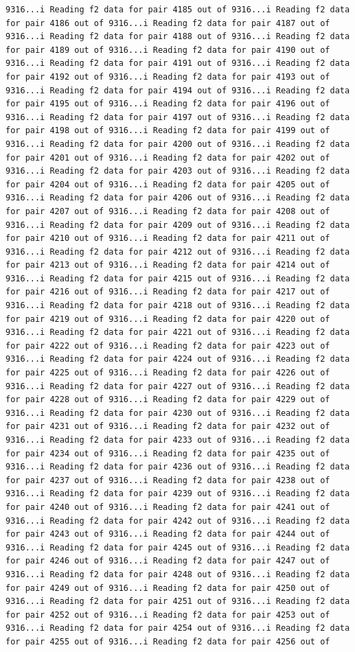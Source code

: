 \documentclass[
]{article}
\begin{document}
\begin{verbatim}
9316...i Reading f2 data for pair 4185 out of 9316...i Reading f2 data for pair 4186 out of 9316...i Reading f2 data for pair 4187 out of 9316...i Reading f2 data for pair 4188 out of 9316...i Reading f2 data for pair 4189 out of 9316...i Reading f2 data for pair 4190 out of 9316...i Reading f2 data for pair 4191 out of 9316...i Reading f2 data for pair 4192 out of 9316...i Reading f2 data for pair 4193 out of 9316...i Reading f2 data for pair 4194 out of 9316...i Reading f2 data for pair 4195 out of 9316...i Reading f2 data for pair 4196 out of 9316...i Reading f2 data for pair 4197 out of 9316...i Reading f2 data for pair 4198 out of 9316...i Reading f2 data for pair 4199 out of 9316...i Reading f2 data for pair 4200 out of 9316...i Reading f2 data for pair 4201 out of 9316...i Reading f2 data for pair 4202 out of 9316...i Reading f2 data for pair 4203 out of 9316...i Reading f2 data for pair 4204 out of 9316...i Reading f2 data for pair 4205 out of 9316...i Reading f2 data for pair 4206 out of 9316...i Reading f2 data for pair 4207 out of 9316...i Reading f2 data for pair 4208 out of 9316...i Reading f2 data for pair 4209 out of 9316...i Reading f2 data for pair 4210 out of 9316...i Reading f2 data for pair 4211 out of 9316...i Reading f2 data for pair 4212 out of 9316...i Reading f2 data for pair 4213 out of 9316...i Reading f2 data for pair 4214 out of 9316...i Reading f2 data for pair 4215 out of 9316...i Reading f2 data for pair 4216 out of 9316...i Reading f2 data for pair 4217 out of 9316...i Reading f2 data for pair 4218 out of 9316...i Reading f2 data for pair 4219 out of 9316...i Reading f2 data for pair 4220 out of 9316...i Reading f2 data for pair 4221 out of 9316...i Reading f2 data for pair 4222 out of 9316...i Reading f2 data for pair 4223 out of 9316...i Reading f2 data for pair 4224 out of 9316...i Reading f2 data for pair 4225 out of 9316...i Reading f2 data for pair 4226 out of 9316...i Reading f2 data for pair 4227 out of 9316...i Reading f2 data for pair 4228 out of 9316...i Reading f2 data for pair 4229 out of 9316...i Reading f2 data for pair 4230 out of 9316...i Reading f2 data for pair 4231 out of 9316...i Reading f2 data for pair 4232 out of 9316...i Reading f2 data for pair 4233 out of 9316...i Reading f2 data for pair 4234 out of 9316...i Reading f2 data for pair 4235 out of 9316...i Reading f2 data for pair 4236 out of 9316...i Reading f2 data for pair 4237 out of 9316...i Reading f2 data for pair 4238 out of 9316...i Reading f2 data for pair 4239 out of 9316...i Reading f2 data for pair 4240 out of 9316...i Reading f2 data for pair 4241 out of 9316...i Reading f2 data for pair 4242 out of 9316...i Reading f2 data for pair 4243 out of 9316...i Reading f2 data for pair 4244 out of 9316...i Reading f2 data for pair 4245 out of 9316...i Reading f2 data for pair 4246 out of 9316...i Reading f2 data for pair 4247 out of 9316...i Reading f2 data for pair 4248 out of 9316...i Reading f2 data for pair 4249 out of 9316...i Reading f2 data for pair 4250 out of 9316...i Reading f2 data for pair 4251 out of 9316...i Reading f2 data for pair 4252 out of 9316...i Reading f2 data for pair 4253 out of 9316...i Reading f2 data for pair 4254 out of 9316...i Reading f2 data for pair 4255 out of 9316...i Reading f2 data for pair 4256 out of 
\end{verbatim}
\end{document}
